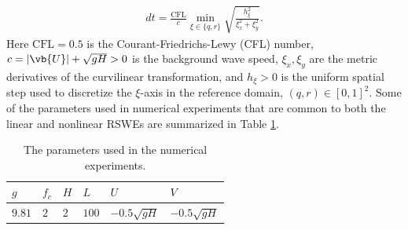 \documentclass{article}
\numberwithin{equation}{section}
\theoremstyle{definition}
\begin{document}
\begin{align}
    dt = \frac{\mathrm{ CFL}}{c} \min_{\xi \in \{q, r\} }\sqrt{  \frac{h_{\xi}^2}{\xi_x^2+\xi_y^2}}.
\end{align}
Here $\mathrm{CFL} =0.5$ is the Courant-Friedrichs-Lewy (CFL) number, $c = |\vb{U}| + \sqrt{gH} >0$ is the background wave speed, $\xi_x, \xi_y$ are the metric derivatives of the curvilinear transformation, and  $h_{\xi}>0$ is the uniform spatial step used to discretize the $\xi$-axis in the reference domain, $(q, r)\in [0,1]^2$.
%
Some of the parameters used in numerical experiments that are common to both the linear and nonlinear RSWEs are summarized in Table \ref{tab:para}.
\begin{table}[h!]
\begin{center}
%
\begin{tabular}{|| m{2em}| m{2em} | m{2em}| m{2em}| m{4em}| m{4em} ||} 
  \hline
    $g$ & $f_c$   & $H$ & $L$ & $U$ & $V$\\
  \hline
    $9.81$ & $2$   & 2 & $100$ & $-0.5\sqrt{gH}$ & $-0.5\sqrt{gH}$ \\
  \hline
\end{tabular}
\caption{The  parameters used in the numerical experiments.}
\label{tab:para}
\end{center}
\end{table}
\end{document}
